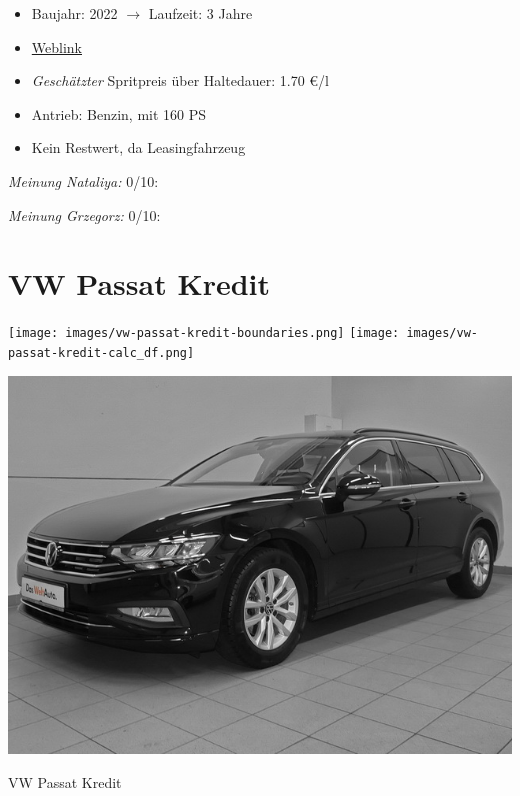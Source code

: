 \documentclass[landscape, DIV=99, 14pt]{scrartcl}
\begin{document}
\begin{itemize}
    \item Baujahr: 2022 $\rightarrow$ Laufzeit: 3 Jahre
    \item \href{https://konfigurator.meinauto.de/kia/neuwagen/cee-d/angebote/cee-d-sporty-wagon/konfigurator/\#!/extras/spirit/8865371/3,11,27/private/109347-4167-291321/1321/61d21ce73c5db/leasing/109348-8088-291322/36,3000,15000,0,0,0,0,0,}{Weblink}
    \item \emph{Gesch\"atzter} Spritpreis \"uber Haltedauer: 1.70 \euro{}/l
    \item Antrieb: Benzin, mit 160 PS
    \item Kein Restwert, da Leasingfahrzeug
\end{itemize}

\begin{small}
\emph{Meinung Nataliya:} 0/10: 
        
\emph{Meinung Grzegorz:} 0/10: 
\end{small}

\pagebreak


\twocolumn

\section*{VW Passat Kredit}
\begin{center}
\texttt{[image: images/vw-passat-kredit-boundaries.png]}
\null
\vspace{0.5cm}
\texttt{[image: images/vw-passat-kredit-calc\_df.png]}
\end{center}

\pagebreak
\begin{center}
\includegraphics[width=0.9\columnwidth]{cars/vw-passat.jpg}

VW Passat Kredit
\end{center}
\end{document}
